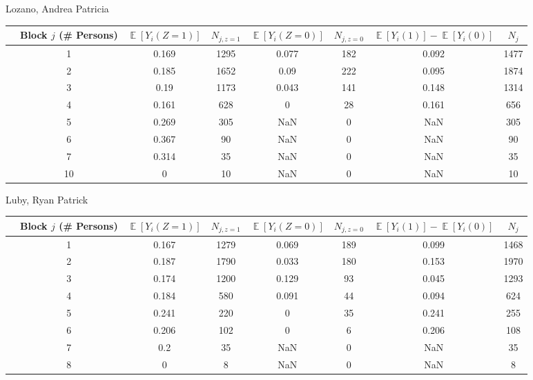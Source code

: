 \documentclass[11pt,notitlepage]{article}
\def\E{\mathop{\mathbb{E}}}
\begin{document}
Lozano, Andrea Patricia


\begin{table}[h!]\small
\begin{center}
\begin{tabular}{rc|cc|cc|cc}
  \hline
 & Block $j$ (\# Persons) & $\E[Y_i(Z=1)]$ & $N_{j, z=1}$ & $\E[Y_i(Z=0)]$ & $N_{j, z=0}$ & $\E[Y_i(1)]-\E[Y_i(0)]$ & $N_j$ \\ 
  \hline
   & 1 & 0.169 & 1295 & 0.077 & 182 & 0.092 & 1477 \\ 
   & 2 & 0.185 & 1652 & 0.09 & 222 & 0.095 & 1874 \\ 
   & 3 & 0.19 & 1173 & 0.043 & 141 & 0.148 & 1314 \\ 
   & 4 & 0.161 & 628 & 0 & 28 & 0.161 & 656 \\ 
   & 5 & 0.269 & 305 & NaN & 0 & NaN & 305 \\ 
   & 6 & 0.367 & 90 & NaN & 0 & NaN & 90 \\ 
   & 7 & 0.314 & 35 & NaN & 0 & NaN & 35 \\ 
   & 10 & 0 & 10 & NaN & 0 & NaN & 10 \\ 
   \hline
\end{tabular}
\end{center}
\end{table}


\clearpage


Luby, Ryan Patrick


\begin{table}[h!]\small
\begin{center}
\begin{tabular}{rc|cc|cc|cc}
  \hline
 & Block $j$ (\# Persons) & $\E[Y_i(Z=1)]$ & $N_{j, z=1}$ & $\E[Y_i(Z=0)]$ & $N_{j, z=0}$ & $\E[Y_i(1)]-\E[Y_i(0)]$ & $N_j$ \\ 
  \hline
   & 1 & 0.167 & 1279 & 0.069 & 189 & 0.099 & 1468 \\ 
   & 2 & 0.187 & 1790 & 0.033 & 180 & 0.153 & 1970 \\ 
   & 3 & 0.174 & 1200 & 0.129 & 93 & 0.045 & 1293 \\ 
   & 4 & 0.184 & 580 & 0.091 & 44 & 0.094 & 624 \\ 
   & 5 & 0.241 & 220 & 0 & 35 & 0.241 & 255 \\ 
   & 6 & 0.206 & 102 & 0 & 6 & 0.206 & 108 \\ 
   & 7 & 0.2 & 35 & NaN & 0 & NaN & 35 \\ 
   & 8 & 0 & 8 & NaN & 0 & NaN & 8 \\ 
  \hline
\end{tabular}
\end{center}
\end{table}
\end{document}
